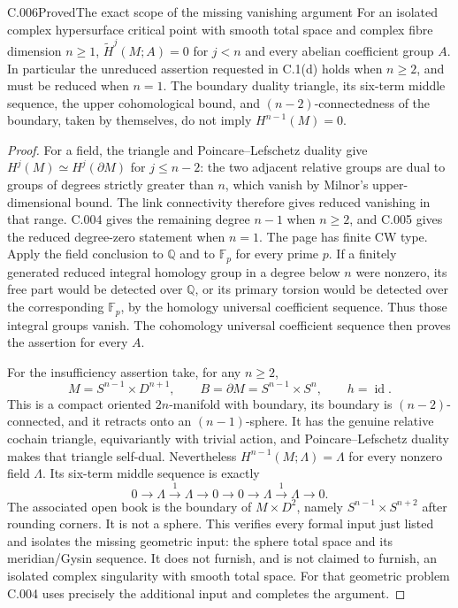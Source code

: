 \begin{saresult}{C.006}{Proved}{The exact scope of the missing vanishing argument}
For an isolated complex hypersurface critical point with smooth total
space and complex fibre dimension $n\geq1$,
$\widetilde H^j(M;A)=0$ for $j<n$ and every abelian coefficient group $A$.
In particular the unreduced assertion requested in C.1(d) holds when
$n\geq2$, and must be reduced when $n=1$.
The boundary duality triangle, its six-term middle sequence, the upper
cohomological bound, and $(n-2)$-connectedness of the boundary, taken by
themselves, do not imply $H^{n-1}(M)=0$.
\end{saresult}
\begin{proof}
For a field, the triangle and Poincare--Lefschetz duality give
$H^j(M)\simeq H^j(\partial M)$ for $j\leq n-2$:
the two adjacent relative groups are dual to groups of degrees strictly
greater than $n$, which vanish by Milnor's upper-dimensional bound.
The link connectivity therefore gives reduced vanishing in that range.
C.004 gives the remaining degree $n-1$ when $n\geq2$, and C.005 gives
the reduced degree-zero statement when $n=1$.
The page has finite CW type. Apply the field conclusion to $\mathbb Q$
and to $\mathbb F_p$ for every prime $p$. If a finitely generated reduced
integral homology group in a degree below $n$ were nonzero, its free part
would be detected over $\mathbb Q$, or its primary torsion would be
detected over the corresponding $\mathbb F_p$, by the homology universal
coefficient sequence. Thus those integral groups vanish. The cohomology
universal coefficient sequence then proves the assertion for every $A$.

For the insufficiency assertion take, for any $n\geq2$,
\[
 M=S^{n-1}\times D^{n+1},\qquad
 B=\partial M=S^{n-1}\times S^n,\qquad h=\operatorname{id}.
\]
This is a compact oriented $2n$-manifold with boundary, its boundary is
$(n-2)$-connected, and it retracts onto an $(n-1)$-sphere. It has the
genuine relative cochain triangle, equivariantly with trivial action,
and Poincare--Lefschetz duality makes that triangle self-dual.
Nevertheless $H^{n-1}(M;\Lambda)=\Lambda$ for every nonzero field
$\Lambda$. Its six-term middle sequence is exactly
\[
0\longrightarrow\Lambda\xrightarrow{1}\Lambda\longrightarrow0
 \longrightarrow0\longrightarrow\Lambda\xrightarrow{1}\Lambda
 \longrightarrow0.
\]
The associated open book is the boundary of $M\times D^2$, namely
$S^{n-1}\times S^{n+2}$ after rounding corners. It is not a sphere.
This verifies every formal input just listed and isolates the missing
geometric input: the sphere total space and its meridian/Gysin sequence.
It does not furnish, and is not claimed to furnish, an isolated complex
singularity with smooth total space. For that geometric problem C.004
uses precisely the additional input and completes the argument.
\end{proof}


